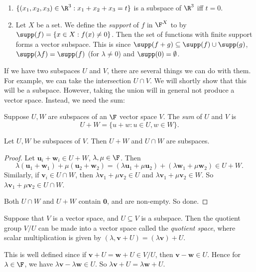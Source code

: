 \documentclass[a4paper]{article}
\begin{document}
\begin{eg}\leavevmode
  \begin{enumerate}
    \item $\{(x_1, x_2, x_3) \in \R^3: x_1 + x_2 + x_3 = t\}$ is a subspace of $\R^3$ iff $t = 0$.
    \item Let $X$ be a set. We define the \emph{support} of $f$ in $\F^X$ to by $\supp(f) = \{x\in X: f(x) \not= 0\}$. Then the set of functions with finite support forms a vector subspace. This is since $\supp (f + g) \subseteq \supp(f) \cup \supp(g)$, $\supp (\lambda f) = \supp (f)$ (for $\lambda \not= 0$) and $\supp (0) = \emptyset$.
  \end{enumerate}
\end{eg}

If we have two subspaces $U$ and $V$, there are several things we can do with them. For example, we can take the intersection $U\cap V$. We will shortly show that this will be a subspace. However, taking the union will in general not produce a vector space. Instead, we need the sum:

\begin{defi}
  Suppose $U, W$ are subspaces of an $\F$ vector space $V$. The \emph{sum} of $U$ and $V$ is
  \[
    U + W = \{u + w: u\in U, w\in W\}.
  \]
\end{defi}

\begin{prop}
  Let $U, W$ be subspaces of $V$. Then $U + W$ and $U\cap W$ are subspaces.
\end{prop}

\begin{proof}
  Let $\mathbf{u}_i + \mathbf{w}_i \in U + W$, $\lambda, \mu\in \F$. Then
  \[
    \lambda(\mathbf{u}_1 + \mathbf{w}_1) + \mu(\mathbf{u}_2 + \mathbf{w}_2) = (\lambda\mathbf{u}_1 + \mu\mathbf{u}_2) + (\lambda\mathbf{w}_1 + \mu\mathbf{w}_2) \in U + W.
  \]
  Similarly, if $\mathbf{v}_i \in U\cap W$, then $\lambda \mathbf{v}_1 + \mu \mathbf{v}_2\in U$ and $\lambda \mathbf{v}_1 + \mu \mathbf{v}_2\in W$. So $\lambda \mathbf{v}_1 + \mu \mathbf{v}_2\in U\cap W$.

  Both $U\cap W$ and $U + W$ contain $\mathbf{0}$, and are non-empty. So done.
\end{proof}

\begin{defi}
  Suppose that $V$ is a vector space, and $U\subseteq V$ is a subspace. Then the quotient group $V/U$ can be made into a vector space called the \emph{quotient space}, where scalar multiplication is given by $(\lambda, \mathbf{v} + U) = (\lambda \mathbf{v}) + U$.

  This is well defined since if $\mathbf{v} + U = \mathbf{w} + U\in V/U$, then $\mathbf{v} - \mathbf{w} \in U$. Hence for $\lambda \in \F$, we have $\lambda \mathbf{v} - \lambda \mathbf{w} \in U$. So $\lambda \mathbf{v} + U = \lambda \mathbf{w} + U$.
\end{defi}
\end{document}
